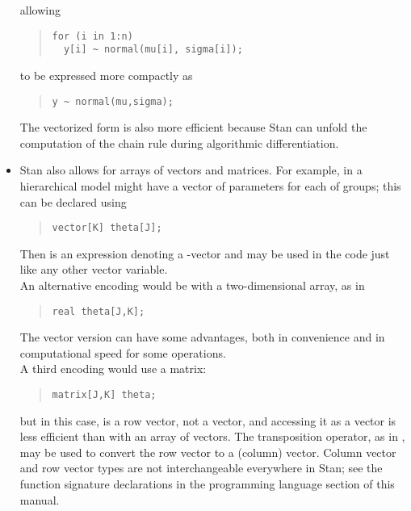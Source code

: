 \begin{itemize}
%
allowing
%
\begin{quote}
\begin{Verbatim}
for (i in 1:n) 
  y[i] ~ normal(mu[i], sigma[i]);
\end{Verbatim}
\end{quote}
%
to be expressed more compactly as 
%
\begin{quote}
\begin{Verbatim}
y ~ normal(mu,sigma);
\end{Verbatim}
\end{quote}
%
The vectorized form is also more efficient because Stan can unfold the
computation of the chain rule during algorithmic differentiation.
%
\item Stan also allows for arrays of vectors and matrices.
  For example, in a hierarchical model might have a vector of 
  parameters for each of  groups; this can be declared using
\begin{quote}
\begin{Verbatim}
vector[K] theta[J];
\end{Verbatim}
\end{quote}
%
Then  is an expression denoting a -vector and
may be used in the code just like any other vector variable.
\\[6pt]
An alternative encoding would be with a two-dimensional array, as in
\begin{quote}
\begin{Verbatim}
real theta[J,K];
\end{Verbatim}
\end{quote}
%
The vector version can have some advantages, both in convenience and
in computational speed for some operations.
\\[6pt]
A third encoding would use a matrix:
%
\begin{quote}
\begin{Verbatim}
matrix[J,K] theta;
\end{Verbatim}
\end{quote}
%
but in this case,  is a row vector, not a vector, and
accessing it as a vector is less efficient than with an array of
vectors.  The transposition operator, as in , may be
used to convert the row vector  to a (column) vector.
Column vector and row vector types are not interchangeable everywhere
in Stan; see the function signature declarations in the programming
language section of this manual.
\end{itemize}

